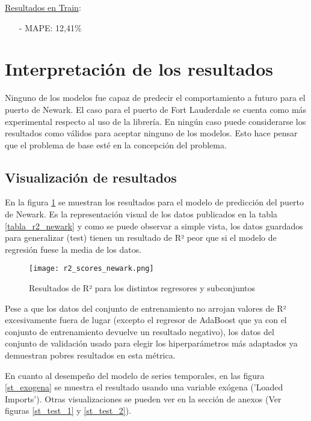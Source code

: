 \documentclass[12pt]{article}
\begin{document}
	\underline{Resultados en Train}: \\
	\begin{itemize}
		\item[-] MAPE: 12,41\%
	\end{itemize}
	
	

\newpage
\section{\label{interpretacion}Interpretación de los resultados}
Ninguno de los modelos fue capaz de predecir el comportamiento a futuro para el puerto de Newark. El caso para el puerto de Fort Lauderdale se cuenta como más experimental respecto al uso de la librería. En ningún caso puede considerarse los resultados como válidos para aceptar ninguno de los modelos. Esto hace pensar que el problema de base esté en la concepción del problema.

	\subsection{Visualización de resultados}
	En la figura \ref{r2_scores_newark} se muestran los resultados para el modelo de predicción del puerto de Newark. Es la representación visual de los datos publicados en la tabla \ref{tabla_r2_newark} y como se puede observar a simple vista, los datos guardados para generalizar (test) tienen un resultado de R² peor que si el modelo de regresión fuese la media de los datos.
	

	\begin{figure}[H]
		\caption{\label{r2_scores_newark} Resultados de R² para los distintos regresores y subconjuntos}
		\centering
		\hspace*{1cm}
		\texttt{[image: r2\_scores\_newark.png]}
	\end{figure}

	Pese a que los datos del conjunto de entrenamiento no arrojan valores de R² excesivamente fuera de lugar (excepto el regresor de AdaBoost que ya con el conjunto de entrenamiento devuelve un resultado negativo), los datos del conjunto de validación usado para elegir los hiperparámetros más adaptados ya demuestran pobres resultados en esta métrica.
	
	En cuanto al desempeño del modelo de series temporales, en las figura \ref{st_exogena} se muestra el resultado usando una variable exógena ('Loaded Imports'). Otras visualizaciones se pueden ver en la sección de anexos (Ver figuras \ref{st_test_1} y \ref{st_test_2}).
	
\end{document}
